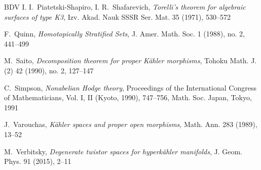 \documentclass[10pt]{amsart}
\begin{document}
\begin{thebibliography}{BDV}
I. I.\ Piatetski-Shapiro, I. R.\ Shafarevich, {\it Torelli's theorem for algebraic surfaces of type K3},
Izv. Akad. Nauk SSSR Ser. Mat. 35 (1971), 530--572

F.\ Quinn, {\it Homotopically Stratified Sets},
J. Amer. Math. Soc. 1 (1988), no. 2, 441--499

M.\ Saito, {\it Decomposition theorem for proper K\"ahler morphisms},
Tohoku Math. J. (2) 42 (1990), no. 2, 127--147


C.\ Simpson, {\it Nonabelian {H}odge theory}, Proceedings of the {I}nternational {C}ongress of
{M}athematicians, {V}ol. {I}, {II} ({K}yoto, 1990), 747--756, Math. Soc. Japan, Tokyo, 1991

J.\ Varouchas, {\it K\"ahler spaces and proper open morphisms},
Math. Ann. 283 (1989), 13--52


M.\ Verbitsky, {\it Degenerate twistor spaces for hyperk\"ahler manifolds},
J. Geom. Phys. 91 (2015), 2--11

\end{thebibliography}
\end{document}
